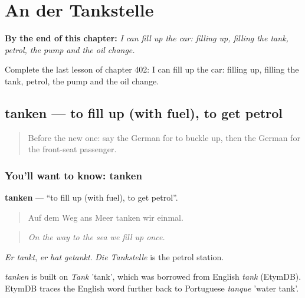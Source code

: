 
\chapter{An der Tankstelle}
\label{ch:ge-an-der-tankstelle}

\begin{chapteropening}
\textbf{By the end of this chapter:} \emph{I can fill up the car: filling up, filling the tank, petrol, the pump and the oil change.}

Complete the last lesson of chapter 402: I can fill up the car: filling up, filling the tank, petrol, the pump and the oil change.
\end{chapteropening}

\section[tanken]{tanken — to fill up (with fuel), to get petrol}

\label{lesson:GE-C402-tanken}



\begin{quote}
Before the new one: say the German for to buckle up, then the German for the front-seat passenger.
\end{quote}

\subsection*{You'll want to know: tanken}
\textbf{tanken} — \textquotedblleft{}to fill up (with fuel), to get petrol\textquotedblright{}.

\begin{quote}
Auf dem Weg ans Meer tanken wir einmal.
\end{quote}

\begin{quote}
\emph{On the way to the sea we fill up once.}
\end{quote}

\emph{Er tankt}, \emph{er hat getankt}. \emph{Die Tankstelle} is the petrol station.

\begin{cousinweb}
\emph{tanken} is built on \emph{Tank} 'tank', which was borrowed from English \emph{tank} (EtymDB). EtymDB traces the English word further back to Portuguese \emph{tanque} 'water tank'.
\end{cousinweb}

